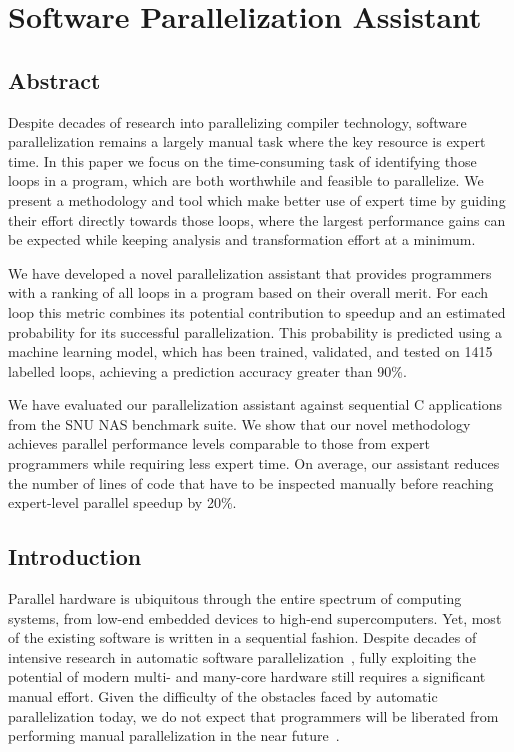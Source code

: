 \chapter{Software Parallelization Assistant}

\section{Abstract}
Despite decades of research into parallelizing compiler technology, software parallelization remains a largely manual task where the key resource is expert time. In this paper we focus on the time-consuming task of identifying those loops in a program, which are both worthwhile and feasible to parallelize. We present a methodology and tool which make better use of expert time by guiding their effort directly towards those loops, where the largest performance gains can be expected while keeping analysis and transformation effort at a minimum.
  
We have developed a novel parallelization assistant that provides programmers with a ranking of all loops in a program based on their overall merit. For each loop this metric combines its potential contribution to speedup and an estimated probability for its successful parallelization. This probability is predicted using a machine learning model, which has been trained, validated, and tested on 1415 labelled loops, achieving a prediction accuracy greater than 90\%.
  
We have evaluated our parallelization assistant against sequential C applications from the SNU NAS benchmark suite. We show that our novel methodology achieves parallel performance levels comparable to those from expert programmers while requiring less expert time. On average, our assistant reduces the number of lines of code that have to be inspected manually before reaching expert-level parallel speedup by 20\%.

\section{Introduction}


Parallel hardware is ubiquitous through the entire spectrum of computing
systems, from low-end embedded devices to high-end supercomputers.
%
Yet, most of the existing software is written in a sequential fashion.
%
Despite decades of intensive research in automatic software
parallelization~\cite{6813266}, fully exploiting the potential of modern multi- and many-core hardware still requires a significant manual effort.
%
Given the difficulty of the obstacles faced by automatic parallelization today,
we do not expect that programmers will be liberated from performing manual
parallelization in the near future~\cite{Larsen:2012:PML:2410141.2410600}.

